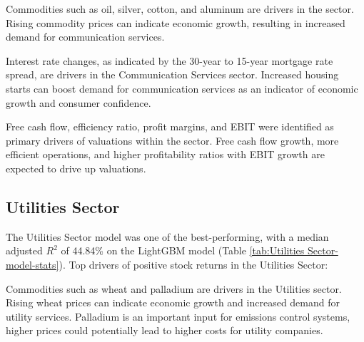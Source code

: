 \documentclass[12pt,a4paper,english]{article}
\begin{document}

Commodities such as oil, silver, cotton, and aluminum are drivers in the sector. Rising commodity prices can indicate economic growth, resulting in increased demand for communication services.

Interest rate changes, as indicated by the 30-year to 15-year mortgage rate spread, are drivers in the Communication Services sector. Increased housing starts can boost demand for communication services as an indicator of economic growth and consumer confidence.

Free cash flow, efficiency ratio, profit margins, and EBIT were identified as primary drivers of valuations within the sector. Free cash flow growth, more efficient operations, and higher profitability ratios with EBIT growth are expected to drive up valuations.

\subsection{Utilities Sector}
\label{sec:utilities}

The Utilities Sector model was one of the best-performing, with a median adjusted $R^2$ of 44.84\% on the LightGBM model (Table \ref{tab:Utilities Sector-model-stats}). Top drivers of positive stock returns in the Utilities Sector:


Commodities such as wheat and palladium are drivers in the Utilities sector. Rising wheat prices can indicate economic growth and increased demand for utility services. Palladium is an important input for emissions control systems, higher prices could potentially lead to higher costs for utility companies.
\end{document}
